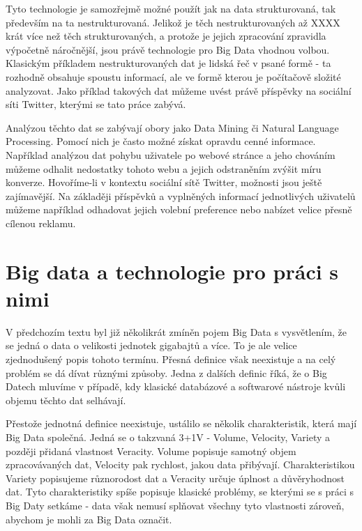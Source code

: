 \documentclass[thesis=B,czech]{FITthesis}[2012/06/26]
\begin{document}
	Tyto technologie je samozřejmě možné použít jak na data strukturovaná, tak především na ta nestrukturovaná. Jelikož je těch nestrukturovaných až XXXX krát více než těch strukturovaných\cite{3}, a protože je jejich zpracování zpravidla výpočetně náročnější, jsou právě technologie pro Big Data vhodnou volbou. Klasickým příkladem nestrukturovaných dat je lidská řeč v psané formě - ta rozhodně obsahuje spoustu informací, ale ve formě kterou je počítačově složité analyzovat. Jako příklad takových dat můžeme uvést právě příspěvky na sociální síti Twitter, kterými se tato práce zabývá. 
	
	Analýzou těchto dat se zabývají obory jako Data Mining či Natural Language Processing. Pomocí nich je často možné získat opravdu cenné informace. Například analýzou dat pohybu uživatele po webové stránce a jeho chováním můžeme odhalit nedostatky tohoto webu a jejich odstraněním zvýšit míru konverze. Hovoříme-li v kontextu sociální sítě Twitter, možnosti jsou ještě zajímavější. Na základěji příspěvků a vyplněných informací jednotlivých uživatelů můžeme například odhadovat jejich volební preference nebo nabízet velice přesně cílenou reklamu. 

\section{Big data a technologie pro práci s nimi}
	V předchozím textu byl již několikrát zmíněn pojem Big Data s vysvětlením, že se jedná o data o velikosti jednotek gigabajtů a více. To je ale velice zjednodušený popis tohoto termínu. Přesná definice však neexistuje a na celý problém se dá dívat různými způsoby. Jedna z dalších definic říká, že o Big Datech mluvíme v případě, kdy klasické databázové a softwarové nástroje kvůli objemu těchto dat selhávají\cite{http://www.webopedia.com/TERM/B/big_data.html}. 

	Přestože jednotná definice neexistuje, ustálilo se několik charakteristik, která mají Big Data společná. Jedná se o takzvaná 3+1V - Volume, Velocity, Variety a později přidaná vlastnost Veracity\cite{bakalarka Customer Intelligence v kontextu BigData}. Volume popisuje samotný objem zpracovávaných dat, Velocity pak rychlost, jakou data přibývají. Charakteristikou Variety popisujeme různorodost dat a Veracity určuje úplnost a důvěryhodnost dat. Tyto charakteristiky spíše popisuje klasické problémy, se kterými se s práci s Big Daty setkáme - data však nemusí splňovat všechny tyto vlastnosti zároveň, abychom je mohli za Big Data označit. 
	
\end{document}
